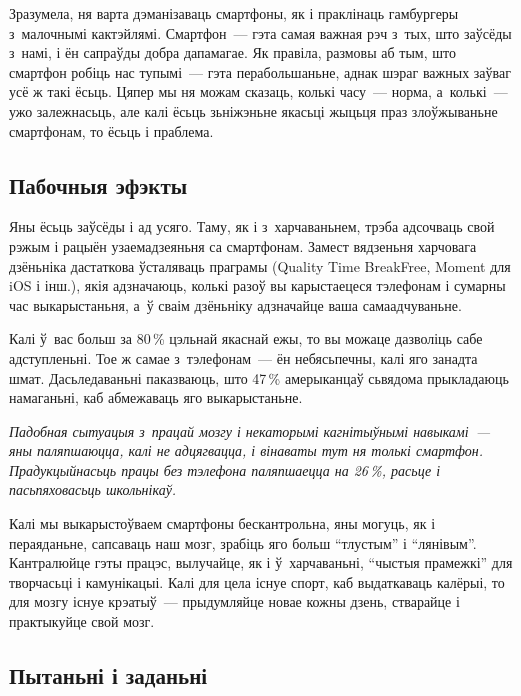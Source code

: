 Зразумела, ня варта дэманізаваць смартфоны, як і праклінаць гамбургеры з~малочнымі кактэйлямі. Смартфон~--- гэта самая важная рэч з~тых, што заўсёды з~намі, і ён сапраўды добра дапамагае. Як правіла, размовы аб тым, што смартфон робіць нас тупымі~--- гэта перабольшаньне, аднак шэраг важных заўваг усё ж такі ёсьць. Цяпер мы ня можам сказаць, колькі часу~--- норма, а~колькі~--- ужо залежнасьць, але калі ёсьць зьніжэньне якасьці жыцьця праз злоўжываньне смартфонам, то ёсьць і праблема.

\subsection*{Пабочныя эфэкты}

Яны ёсьць заўсёды і ад усяго. Таму, як і з~харчаваньнем, трэба адсочваць свой рэжым і рацыён узаемадзеяньня са смартфонам. Замест вядзеньня харчовага дзёньніка дастаткова ўсталяваць праграмы (Quality Time BreakFree, Moment для iOS і інш.), якія адзначаюць, колькі разоў вы карыстаецеся тэлефонам і сумарны час выкарыстаньня, а~ў сваім дзёньніку адзначайце ваша самаадчуваньне.


Калі ў~вас больш за 80\,\% цэльнай якаснай ежы, то вы можаце дазволіць сабе адступленьні. Тое ж самае з~тэлефонам~--- ён небясьпечны, калі яго занадта шмат. Дасьледаваньні паказваюць, што 47\,\% амерыканцаў сьвядома прыкладаюць намаганьні, каб абмежаваць яго выкарыстаньне.

\emph{Падобная сытуацыя з~працай мозгу і некаторымі кагнітыўнымі навыкамі~--- яны паляпшаюцца, калі не адцягвацца, і вінаваты тут ня толькі смартфон. Прадукцыйнасьць працы без тэлефона паляпшаецца на 26\,\%, расьце і пасьпяховасьць школьнікаў.}

Калі мы выкарыстоўваем смартфоны бескантрольна, яны могуць, як і пераяданьне, сапсаваць наш мозг, зрабіць яго больш ``тлустым'' і ``лянівым''. Кантралюйце гэты працэс, вылучайце, як і ў~харчаваньні, ``чыстыя прамежкі'' для творчасьці і камунікацыі. Калі для цела існуе спорт, каб выдаткаваць калёрыі, то для мозгу існуе крэатыў~--- прыдумляйце новае кожны дзень, стварайце і практыкуйце свой мозг.

\subsection*{Пытаньні і заданьні}

